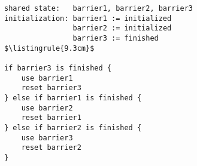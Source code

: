 \begin{center}
\begin{minipage}{\textwidth}
\begin{lstlisting}[mathescape, linewidth=9.3cm]
shared state:   barrier1, barrier2, barrier3
initialization: barrier1 := initialized
                barrier2 := initialized
                barrier3 := finished
$\listingrule{9.3cm}$

if barrier3 is finished {
	use barrier1
	reset barrier3
} else if barrier1 is finished {
	use barrier2
	reset barrier1
} else if barrier2 is finished {
	use barrier3
	reset barrier2
}
\end{lstlisting}
\end{minipage}
\end{center}
